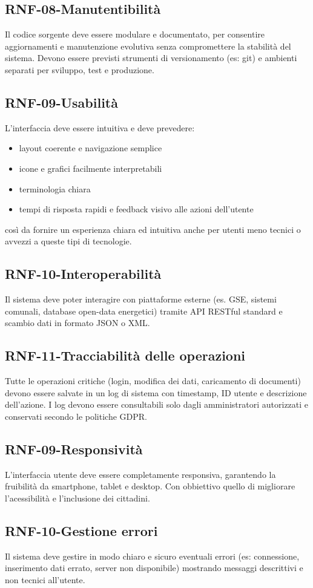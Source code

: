 \subsection*{RNF-08-Manutentibilità}
Il codice sorgente deve essere modulare e documentato,
per consentire aggiornamenti e manutenzione evolutiva
senza compromettere la stabilità del sistema.
Devono essere previsti strumenti di versionamento (es: git)
e ambienti separati per sviluppo, test e produzione.
\subsection*{RNF-09-Usabilità}
L'interfaccia deve essere intuitiva e deve prevedere:
\begin{itemize}
    \item layout coerente e navigazione semplice
    \item icone e grafici facilmente interpretabili
    \item terminologia chiara 
    \item tempi di risposta rapidi e feedback visivo alle azioni dell'utente
\end{itemize}
così da fornire un esperienza chiara ed intuitiva anche per utenti meno
tecnici o avvezzi a queste tipi di tecnologie.
\subsection*{RNF-10-Interoperabilità}
Il sistema deve poter interagire con piattaforme esterne
(es. GSE, sistemi comunali, database open-data energetici) tramite API RESTful
standard e scambio dati in formato JSON o XML.
\subsection*{RNF-11-Tracciabilità delle operazioni}
Tutte le operazioni critiche (login, modifica dei dati, caricamento di documenti)
devono essere salvate in un log di sistema con timestamp,
ID utente e descrizione dell’azione. I log devono essere consultabili solo dagli
amministratori autorizzati e conservati secondo le politiche GDPR.
\subsection*{RNF-09-Responsività}
L’interfaccia utente deve essere completamente responsiva,
garantendo la fruibilità da smartphone, tablet e desktop.
Con obbiettivo quello di migliorare l'acessibilità e l'inclusione
dei cittadini.
\subsection*{RNF-10-Gestione errori}
Il sistema deve gestire in modo chiaro e sicuro eventuali
errori (es: connessione, inserimento dati errato, server non
disponibile) mostrando messaggi descrittivi e non
tecnici all’utente.